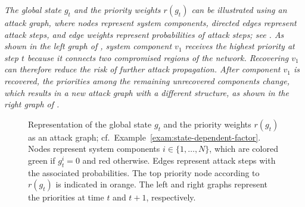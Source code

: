 \documentclass[sigconf]{acmart}
\begin{document}
%
\begin{example}
\label{exam:state-dependent-factor}
\textit{The global state $g_t$ and the priority weights $r(g_t)$ can be illustrated using an attack graph, where nodes represent system components, directed edges represent attack steps, and edge weights represent probabilities of attack steps; see . As shown in the left graph of , system component $v_1$ receives the highest priority at step $t$ because it connects two compromised regions of the network. Recovering $v_1$ can therefore reduce the risk of further attack propagation. After component $v_1$ is recovered, the priorities among the remaining unrecovered components change, which results in a new attack graph with a different structure, as shown in the right graph of .}
\end{example}

\begin{figure}[H]
  \centering
  \scalebox{0.95}{

}
\caption{Representation of the global state $g_t$ and the priority weights $r(g_t)$ as an attack graph; cf.~Example~\ref{exam:state-dependent-factor}. Nodes represent system components $i\in \{1,\hdots,N\}$, which are colored green if $g^i_t=0$ and red otherwise. Edges represent attack steps with the associated probabilities. The top priority node according to $r(g_t)$ is indicated in orange. The left and right graphs represent the priorities at time $t$ and $t+1$, respectively.}
\label{fig:state-dependent-priority}
\end{figure}
\end{document}

